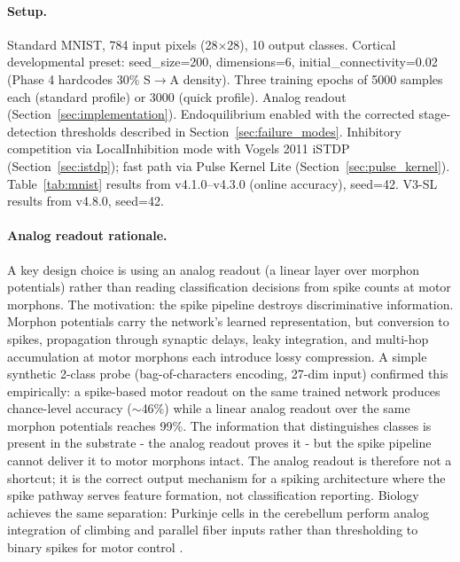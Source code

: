 \paragraph{Setup.}
Standard MNIST, 784 input pixels (28$\times$28), 10 output classes. Cortical developmental preset: seed\_size=200, dimensions=6, initial\_connectivity=0.02 (Phase 4 hardcodes 30\% S$\to$A density). Three training epochs of 5000 samples each (standard profile) or 3000 (quick profile). Analog readout (Section~\ref{sec:implementation}). Endoquilibrium enabled with the corrected stage-detection thresholds described in Section~\ref{sec:failure_modes}. Inhibitory competition via LocalInhibition mode with Vogels 2011 iSTDP (Section~\ref{sec:istdp}); fast path via Pulse Kernel Lite (Section~\ref{sec:pulse_kernel}). Table~\ref{tab:mnist} results from v4.1.0--v4.3.0 (online accuracy), seed=42. V3-SL results from v4.8.0, seed=42.

\paragraph{Analog readout rationale.}
A key design choice is using an analog readout (a linear layer over morphon potentials) rather than reading classification decisions from spike counts at motor morphons. The motivation: the spike pipeline destroys discriminative information. Morphon potentials carry the network's learned representation, but conversion to spikes, propagation through synaptic delays, leaky integration, and multi-hop accumulation at motor morphons each introduce lossy compression. A simple synthetic 2-class probe (bag-of-characters encoding, 27-dim input) confirmed this empirically: a spike-based motor readout on the same trained network produces chance-level accuracy ($\sim$46\%) while a linear analog readout over the same morphon potentials reaches 99\%. The information that distinguishes classes is present in the substrate - the analog readout proves it - but the spike pipeline cannot deliver it to motor morphons intact. The analog readout is therefore not a shortcut; it is the correct output mechanism for a spiking architecture where the spike pathway serves feature formation, not classification reporting. Biology achieves the same separation: Purkinje cells in the cerebellum perform analog integration of climbing and parallel fiber inputs rather than thresholding to binary spikes for motor control \cite{ito2006cerebellar}.

